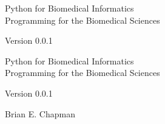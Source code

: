 \documentclass[10pt]{book}
\newcommand{\theversion}{0.0.1}
\newcommand{\thedate}{}
\begin{document}
\begin{latexonly}

\renewcommand{\blankpage}{\thispagestyle{empty} \quad \newpage}



\thispagestyle{empty}

\begin{flushright}
\vspace*{2.0in}

\begin{spacing}{3}
{\huge Python for Biomedical Informatics}\\
{\Large Programming for the Biomedical Sciences}
\end{spacing}

\vspace{0.25in}

Version \theversion

\thedate

\vfill

\end{flushright}


\blankpage
\blankpage

\pagebreak
\thispagestyle{empty}

\begin{flushright}
\vspace*{2.0in}

\begin{spacing}{3}
{\huge Python for Biomedical Informatics}\\
{\Large Programming for the Biomedical Sciences}
\end{spacing}

\vspace{0.25in}

Version \theversion

\thedate

\vspace{1in}


{\Large
Brian E. Chapman\\
}

\end{flushright}



\end{latexonly}
\end{document}
